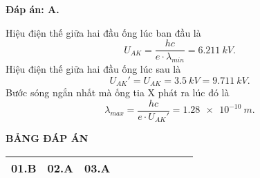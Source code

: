 \begin{enumerate}[label=\bfseries Câu \arabic*:]
\loigiai
{		\textbf{Đáp án: A.}
	
	Hiệu điện thế giữa hai đầu ống lúc ban đầu là
	$$
	U_{AK} = \dfrac{hc}{e\cdot \lambda_{min}} = \SI{6,211}{kV}.
	$$
	Hiệu điện thế giữa hai đầu ống lúc sau là
	$$
	U_{AK}' = U_{AK} = \SI{3,5}{kV} = \SI{9,711}{kV}.
	$$
	Bước sóng ngắn nhất mà ống tia X phát ra lúc đó là
	$$
	\lambda_{max} = \dfrac{hc}{e \cdot U_{AK}'} = \SI{1,28e-10}{m}.
	$$
}
	
\end{enumerate}

\loigiai
{
\begin{center}
	\textbf{BẢNG ĐÁP ÁN}
\end{center}
\begin{center}
	\begin{tabular}{|m{2.8em}|m{2.8em}|m{2.8em}|m{2.8em}|m{2.8em}|m{2.8em}|m{2.8em}|m{2.8em}|m{2.8em}|m{2.8em}|}
		\hline
		01.B & 02.A  & 03.A  &  &  &  & & & & \\
		\hline
		
	\end{tabular}
\end{center}
}


